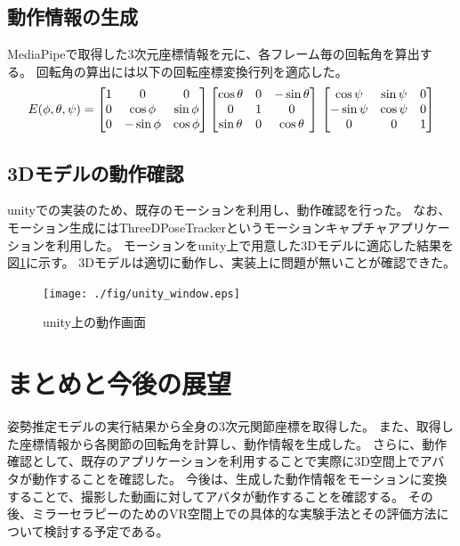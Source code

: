 \subsection{動作情報の生成}
MediaPipeで取得した3次元座標情報を元に、各フレーム毎の回転角を算出する。
回転角の算出には以下の回転座標変換行列を適応した。
\vspace{-5.0mm}
\begin{dmath}
    E(\phi,\theta,\psi)=\begin{bmatrix}
        1&0&0\\
        0&\cos\phi&\sin\phi\\
        0&-\sin\phi&\cos\phi\\
    \end{bmatrix}
    \begin{bmatrix}
        \cos\theta&0&-\sin\theta\\
        0&1&0\\
        \sin\theta&0&\cos\theta\\
    \end{bmatrix}\\
    \begin{bmatrix}
        \cos\psi&\sin\psi&0\\
        -\sin\psi&\cos\psi&0\\
        0&0&1\\
    \end{bmatrix}
\end{dmath}
\normalsize
\subsection{3Dモデルの動作確認}
unityでの実装のため、既存のモーションを利用し、動作確認を行った。
なお、モーション生成にはThreeDPoseTracker\cite{ThreeDPoseTracker}というモーションキャプチャアプリケーションを利用した。
モーションをunity上で用意した3Dモデルに適応した結果を図\ref{fig:unity}に示す。
3Dモデルは適切に動作し、実装上に問題が無いことが確認できた。
\begin{figure}[H]
    \centering
    \texttt{[image: ./fig/unity\_window.eps]}
    \caption{unity上の動作画面}
    \label{fig:unity}
\end{figure}
\vspace{-4.0mm}
\section{まとめと今後の展望}
\vspace{-2.0mm}
姿勢推定モデルの実行結果から全身の3次元関節座標を取得した。
また、取得した座標情報から各関節の回転角を計算し、動作情報を生成した。
さらに、動作確認として、既存のアプリケーションを利用することで実際に3D空間上でアバタが動作することを確認した。
今後は、生成した動作情報をモーションに変換することで、撮影した動画に対してアバタが動作することを確認する。
その後、ミラーセラピーのためのVR空間上での具体的な実験手法とその評価方法について検討する予定である。


